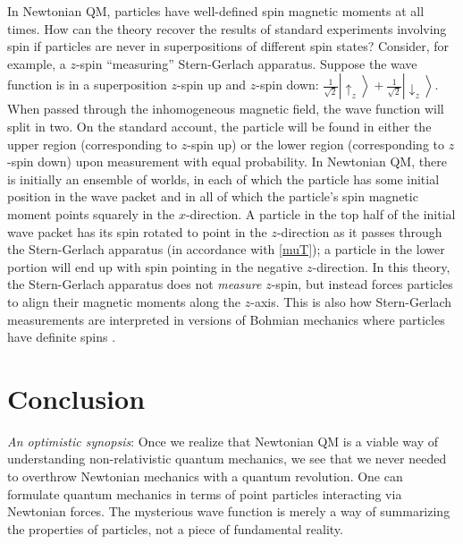 \documentclass[onecolumn,secnumarabic,balancelastpage,amsmath,amssymb,nofootinbib]{article}
\begin{document}
In Newtonian QM, particles have well-defined spin magnetic moments at all times.  How can the theory recover the results of standard experiments involving spin if particles are never in superpositions of different spin states?  Consider, for example, a $z$-spin ``measuring'' Stern-Gerlach apparatus.  Suppose the wave function is in a superposition $z$-spin up and $z$-spin down: $\frac{1}{\sqrt{2}}\left|\uparrow_z\right\rangle+\frac{1}{\sqrt{2}}\left|\downarrow_z\right\rangle$.  When passed through the inhomogeneous magnetic field, the wave function will split in two.  On the standard account, the particle will be found in either the upper region (corresponding to $z$-spin up) or the lower region (corresponding to $z$-spin down) upon measurement with equal probability.  In Newtonian QM, there is initially an ensemble of worlds, in each of which the particle has some initial position in the wave packet and in all of which the particle's spin magnetic moment points squarely in the $x$-direction.  A particle in the top half of the initial wave packet has its spin rotated to point in the $z$-direction as it passes through the Stern-Gerlach apparatus (in accordance with \eqref{muT}); a particle in the lower portion will end up with spin pointing in the negative $z$-direction.  In this theory, the Stern-Gerlach apparatus does not \emph{measure} $z$-spin, but instead forces particles to align their magnetic moments along the $z$-axis.  This is also how Stern-Gerlach measurements are interpreted in versions of Bohmian mechanics where particles have definite spins \citep[see][ch. 9]{dewdney1986,holland}.

\section{Conclusion}\label{conchshell}

\emph{An optimistic synopsis}: Once we realize that Newtonian QM is a viable way of understanding non-relativistic quantum mechanics, we see that we never needed to overthrow Newtonian mechanics with a quantum revolution.  One can formulate quantum mechanics in terms of point particles interacting via Newtonian forces.  The mysterious wave function is merely a way of summarizing the properties of particles, not a piece of fundamental reality.
\end{document}
